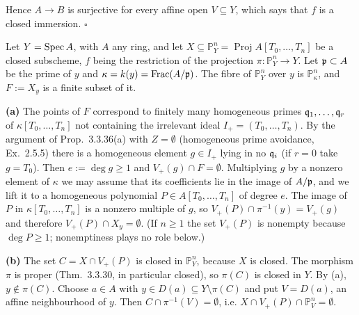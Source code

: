 \documentclass[11pt]{article}
\begin{document}
Hence $A\to B$ is surjective for every affine open $V\subseteq Y$, which says that $f$ is a closed immersion. \hfill$\square$

\pf
Let $Y=\operatorname{Spec} A$, with $A$ any ring, and let $X\subseteq\mathbb P^n_Y=\operatorname{Proj}A[T_0,\dots,T_n]$ be a closed subscheme, $f$ being the restriction of the projection $\pi:\mathbb P^n_Y\to Y$. Let $\mathfrak p\subset A$ be the prime of $y$ and $\kappa=k(y)=\operatorname{Frac}(A/\mathfrak p)$. The fibre of $\mathbb P^n_Y$ over $y$ is $\mathbb P^n_\kappa$, and $F:=X_y$ is a finite subset of it.

\textbf{(a)} The points of $F$ correspond to finitely many homogeneous primes $\mathfrak q_1,\dots,\mathfrak q_r$ of $\kappa[T_0,\dots,T_n]$ not containing the irrelevant ideal $I_+=(T_0,\dots,T_n)$. By the argument of Prop.~3.3.36(a) with $Z=\emptyset$ (homogeneous prime avoidance, Ex.~2.5.5) there is a homogeneous element $g\in I_+$ lying in no $\mathfrak q_i$ (if $r=0$ take $g=T_0$). Then $e:=\deg g\ge1$ and $V_+(g)\cap F=\emptyset$. Multiplying $g$ by a nonzero element of $\kappa$ we may assume that its coefficients lie in the image of $A/\mathfrak p$, and we lift it to a homogeneous polynomial $P\in A[T_0,\dots,T_n]$ of degree $e$. The image of $P$ in $\kappa[T_0,\dots,T_n]$ is a nonzero multiple of $g$, so $V_+(P)\cap\pi^{-1}(y)=V_+(g)$ and therefore $V_+(P)\cap X_y=\emptyset$. (If $n\ge1$ the set $V_+(P)$ is nonempty because $\deg P\ge1$; nonemptiness plays no role below.)

\textbf{(b)} The set $C=X\cap V_+(P)$ is closed in $\mathbb P^n_Y$, because $X$ is closed. The morphism $\pi$ is proper (Thm.~3.3.30, in particular closed), so $\pi(C)$ is closed in $Y$. By (a), $y\notin\pi(C)$. Choose $a\in A$ with $y\in D(a)\subseteq Y\setminus\pi(C)$ and put $V=D(a)$, an affine neighbourhood of $y$. Then $C\cap\pi^{-1}(V)=\emptyset$, i.e. $X\cap V_+(P)\cap\mathbb P^n_V=\emptyset$.
\end{document}
